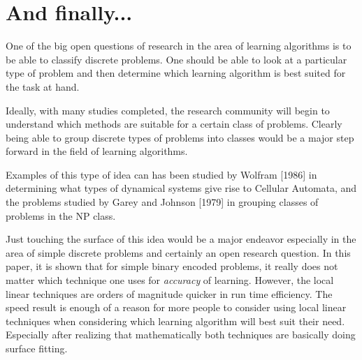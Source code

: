 \section{And finally...}

	One of the big open questions of research in the area of
learning algorithms is to be able to classify discrete problems.  One
should be able to look at a particular type of problem and then
determine which learning algorithm is best suited for the task at
hand.

	Ideally, with many studies completed, the research community
will begin to understand which methods are suitable for a certain
class of problems.  Clearly being able to group discrete types of
problems into classes would be a major step forward in the field of
learning algorithms.  

	Examples of this type of idea can has been studied by Wolfram
[1986] in determining what types of dynamical systems give rise to
Cellular Automata, and the problems studied by Garey and Johnson [1979]
in grouping classes of problems in the NP class.

	Just touching the surface of this idea would be a major
endeavor especially in the area of simple discrete problems and
certainly an open research question.  In this paper, it is shown that
for simple binary encoded problems, it really does not matter which
technique one uses for {\it accuracy} of learning.  However, the local
linear techniques are orders of magnitude quicker in run time
efficiency.  The speed result is enough of a reason for more people to
consider using local linear techniques when considering which learning
algorithm will best suit their need.  Especially after realizing that
mathematically both techniques are basically doing surface fitting.


